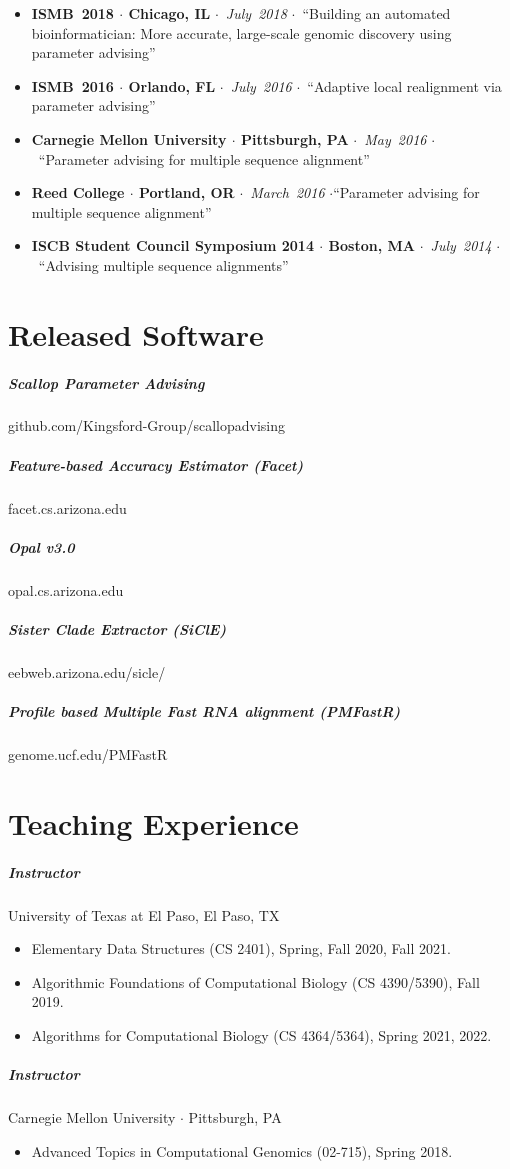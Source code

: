 \documentclass[10pt,letterpaper]{article}
\newcommand{\bigdot}{$\cdot$\xspace}
\begin{document}
\begin{itemize}[leftmargin=*,labelindent=5pt,itemindent=-15pt]
    \item \textbf{ISMB~2018 \bigdot Chicago, IL} \bigdot~\textit{July~2018} \bigdot~``Building an automated bioinformatician: More accurate, large-scale genomic discovery using parameter advising''
    \item \textbf{ISMB~2016 \bigdot Orlando, FL} \bigdot~\textit{July~2016} \bigdot~``Adaptive local realignment via parameter advising'' 
    \item \textbf{Carnegie Mellon University \bigdot Pittsburgh, PA} \bigdot~\textit{May~2016} \bigdot~``Parameter advising for multiple sequence alignment''
    \item \textbf{Reed College \bigdot Portland, OR} \bigdot~\textit{March~2016} \bigdot ``Parameter advising for multiple sequence alignment''
    \item \textbf{ISCB Student Council Symposium 2014 \bigdot  Boston, MA} \bigdot~\textit{July~2014} \bigdot~``Advising multiple sequence alignments''
   
\end{itemize}


\section*{Released Software}
\subparagraph{Scallop Parameter Advising}						github.com/Kingsford-Group/scallopadvising
\subparagraph{Feature-based Accuracy Estimator (Facet)} 			facet.cs.arizona.edu
\subparagraph{Opal v3.0}										opal.cs.arizona.edu 
\subparagraph{Sister Clade Extractor (SiClE)}						eebweb.arizona.edu/sicle/
\subparagraph{Profile based Multiple Fast RNA alignment (PMFastR)}	genome.ucf.edu/PMFastR 

\section*{Teaching Experience}

\subparagraph{Instructor}  University of Texas at El Paso, El Paso, TX
\begin{itemize}
	\item Elementary Data Structures (CS 2401), Spring, Fall 2020, Fall 2021.
	\item Algorithmic Foundations of Computational Biology (CS 4390/5390), Fall 2019.
	\item Algorithms for Computational Biology (CS 4364/5364), Spring 2021, 2022.
\end{itemize}

\subparagraph{Instructor}  Carnegie Mellon University \bigdot Pittsburgh, PA
\begin{itemize}
    \item Advanced Topics in Computational Genomics (02-715), Spring 2018.
\end{itemize}
\end{document}

